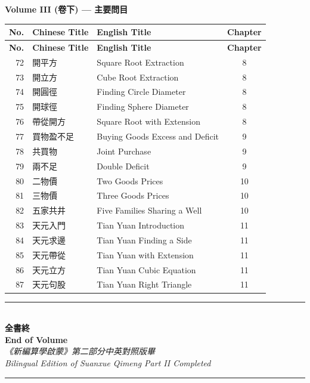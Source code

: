 \documentclass[11pt,a4paper]{article}
\newcommand{\longline}{\noindent\rule{\textwidth}{0.4pt}}
\begin{document}
\begin{center}
\textbf{Volume III (卷下) --- 主要問目}

\vspace{0.3cm}
\begin{longtable}{|r|l|l|c|}
\hline
\textbf{No.} & \textbf{Chinese Title} & \textbf{English Title} & \textbf{Chapter} \\
\hline
\endfirsthead
\hline
\textbf{No.} & \textbf{Chinese Title} & \textbf{English Title} & \textbf{Chapter} \\
\hline
\endhead
72 & 開平方 & Square Root Extraction & 8 \\
73 & 開立方 & Cube Root Extraction & 8 \\
74 & 開圓徑 & Finding Circle Diameter & 8 \\
75 & 開球徑 & Finding Sphere Diameter & 8 \\
76 & 帶從開方 & Square Root with Extension & 8 \\
\hline
77 & 買物盈不足 & Buying Goods Excess and Deficit & 9 \\
78 & 共買物 & Joint Purchase & 9 \\
79 & 兩不足 & Double Deficit & 9 \\
\hline
80 & 二物價 & Two Goods Prices & 10 \\
81 & 三物價 & Three Goods Prices & 10 \\
82 & 五家共井 & Five Families Sharing a Well & 10 \\
\hline
83 & 天元入門 & Tian Yuan Introduction & 11 \\
84 & 天元求邊 & Tian Yuan Finding a Side & 11 \\
85 & 天元帶從 & Tian Yuan with Extension & 11 \\
86 & 天元立方 & Tian Yuan Cubic Equation & 11 \\
87 & 天元句股 & Tian Yuan Right Triangle & 11 \\
\hline
\end{longtable}
\end{center}

\vspace{1cm}
\begin{center}
\longline\\[0.5cm]
{\Large\bfseries\color{chaptercolor} 全書終}\\[0.3cm]
{\Large\bfseries\color{chaptercolor} End of Volume}\\[0.5cm]
\textit{《新編算學啟蒙》第二部分中英對照版畢}\\
\textit{Bilingual Edition of Suanxue Qimeng Part II Completed}\\[0.5cm]
\longline
\end{center}
\end{document}
